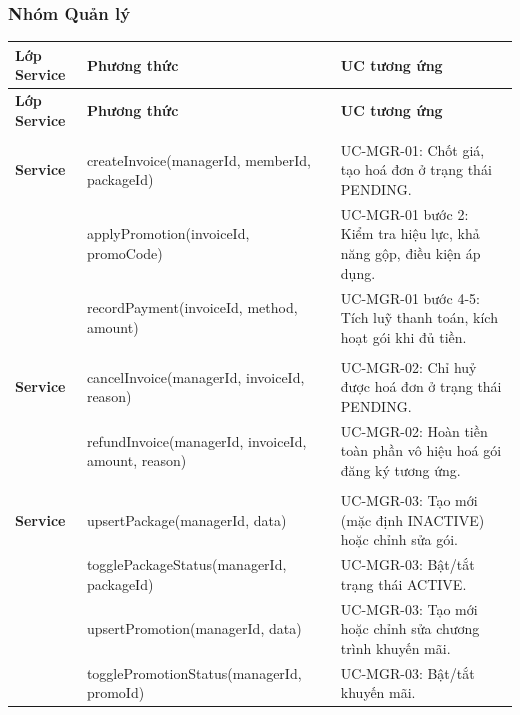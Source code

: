 \subsubsection*{Nhóm Quản lý}

\begingroup
\renewcommand{\arraystretch}{1.3}
\begin{longtable}{|>{\centering\arraybackslash}m{2.8cm}|>{\sloppy\small\ttfamily\raggedright\arraybackslash}p{7cm}|>{\raggedright\arraybackslash}m{4.5cm}|}
\hline
\textbf{Lớp Service} & \normalfont\normalsize\textbf{Phương thức} & \textbf{UC tương ứng} \\ \hline
\endfirsthead
\hline
\textbf{Lớp Service} & \normalfont\normalsize\textbf{Phương thức} & \textbf{UC tương ứng} \\ \hline
\endhead
\hline
\endfoot

\multirow{3}{*}{\makecell{\textbf{POS}\\\textbf{Service}}} &
  createInvoice(managerId, memberId, packageId) &
  UC-MGR-01: Chốt giá, tạo hoá đơn ở trạng thái PENDING. \\ \cline{2-3}
& applyPromotion(invoiceId, promoCode) &
  UC-MGR-01 bước 2: Kiểm tra hiệu lực, khả năng gộp, điều kiện áp dụng. \\ \cline{2-3}
& recordPayment(invoiceId, method, amount) &
  UC-MGR-01 bước 4-5: Tích luỹ thanh toán, kích hoạt gói khi đủ tiền. \\ \hline

\multirow{2}{*}{\makecell{\textbf{Refund}\\\textbf{Service}}} &
  cancelInvoice(managerId, invoiceId, reason) &
  UC-MGR-02: Chỉ huỷ được hoá đơn ở trạng thái PENDING. \\ \cline{2-3}
& refundInvoice(managerId, invoiceId, amount, reason) &
  UC-MGR-02: Hoàn tiền toàn phần vô hiệu hoá gói đăng ký tương ứng. \\ \hline

\multirow{4}{*}{\makecell{\textbf{Catalog}\\\textbf{Service}}} &
  upsertPackage(managerId, data) &
  UC-MGR-03: Tạo mới (mặc định INACTIVE) hoặc chỉnh sửa gói. \\ \cline{2-3}
& togglePackageStatus(managerId, packageId) &
  UC-MGR-03: Bật/tắt trạng thái ACTIVE. \\ \cline{2-3}
& upsertPromotion(managerId, data) &
  UC-MGR-03: Tạo mới hoặc chỉnh sửa chương trình khuyến mãi. \\ \cline{2-3}
& togglePromotionStatus(managerId, promoId) &
  UC-MGR-03: Bật/tắt khuyến mãi. \\ \hline


\end{longtable}
